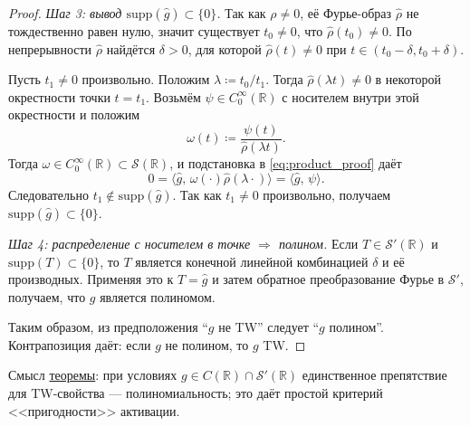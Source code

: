 \documentclass[../NDCNNAI_main.tex]{subfiles}
\begin{document}
\begin{proof}
\medskip
\emph{Шаг 3: вывод \(\mathrm{supp}(\widehat g)\subset\{0\}\).}
Так как \(\rho\neq 0\), её Фурье-образ \(\widehat\rho\) не тождественно равен нулю, значит существует \(t_0\neq 0\), что \(\widehat\rho(t_0)\neq 0\).
По непрерывности \(\widehat\rho\) найдётся \(\delta>0\), для которой \(\widehat\rho(t)\neq 0\) при \(t\in(t_0-\delta,t_0+\delta)\).

Пусть \(t_1\neq 0\) произвольно. Положим \(\lambda\coloneq t_0/t_1\).
Тогда \(\widehat\rho(\lambda t)\neq 0\) в некоторой окрестности точки \(t=t_1\).
Возьмём \(\psi\in C_0^\infty(\mathbb R)\) с носителем внутри этой окрестности и положим
\[
\omega(t)\coloneq\frac{\psi(t)}{\widehat\rho(\lambda t)}.
\]
Тогда \(\omega\in C_0^\infty(\mathbb R)\subset\mathcal S(\mathbb R)\), и подстановка в \eqref{eq:product_proof} даёт
\[
0=\langle \widehat g,\,\omega(\cdot)\widehat\rho(\lambda\cdot)\rangle
=\langle \widehat g,\,\psi\rangle.
\]
Следовательно \(t_1\notin \mathrm{supp}(\widehat g)\). Так как \(t_1\neq 0\) произвольно, получаем \(\mathrm{supp}(\widehat g)\subset\{0\}\).

\medskip
\emph{Шаг 4: распределение с носителем в точке \(\Rightarrow\) полином.}
Если \(T\in\mathcal S'(\mathbb R)\) и \(\mathrm{supp}(T)\subset\{0\}\), то \(T\) является конечной линейной комбинацией \(\delta\) и её производных.
Применяя это к \(T=\widehat g\) и затем обратное преобразование Фурье в \(\mathcal S'\),
получаем, что \(g\) является полиномом.

Таким образом, из предположения “\(g\) не TW” следует “\(g\) полином”.
Контрапозиция даёт: если \(g\) не полином, то \(g\) TW.
\end{proof}

\begin{remark}
Смысл \hyperref[thm:TW_nonpoly]{теоремы}: при условиях \(g\in C(\mathbb R)\cap\mathcal S'(\mathbb R)\)
единственное препятствие для TW-свойства --- полиномиальность; это даёт простой критерий <<пригодности>> активации.
\end{remark}
\end{document}
